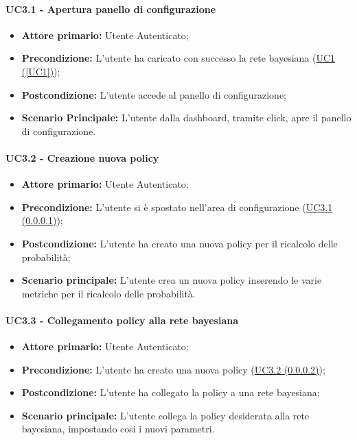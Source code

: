 \paragraph{UC3.1 - Apertura panello di configurazione}\label{UC3.1}
\begin{itemize}
	\item \textbf{Attore primario:} Utente Autenticato; 
	\item \textbf{Precondizione:} L'utente ha caricato con successo la rete bayesiana (\hyperref[UC1]{UC1 (\ref*{UC1})});
	\item \textbf{Postcondizione:} L'utente accede al panello di configurazione;
	\item \textbf{Scenario Principale:} L'utente dalla dashboard, tramite click, apre il panello di configurazione. 
\end{itemize}

\paragraph{UC3.2 - Creazione nuova policy}\label{UC3.2}

\begin{itemize}
	\item \textbf{Attore primario:} Utente Autenticato; 
	\item \textbf{Precondizione:} L'utente si è spostato nell'area di configurazione (\hyperref[UC3.1]{UC3.1 (\ref*{UC3.1})});
	\item \textbf{Postcondizione:} L'utente ha creato una nuova policy per il ricalcolo delle probabilità; 
	\item \textbf{Scenario principale:} L'utente crea un nuova policy inserendo le varie metriche per il ricalcolo delle probabilità.
\end{itemize}

\paragraph{UC3.3 - Collegamento policy alla rete bayesiana}\label{UC3.3}
\begin{itemize}
	\item \textbf{Attore primario:} Utente Autenticato; 
	\item \textbf{Precondizione:} L'utente ha creato una nuova policy (\hyperref[UC3.2]{UC3.2 (\ref{UC3.2})});
	\item \textbf{Postcondizione:} L'utente ha collegato la policy a una rete bayesiana; 
	\item \textbf{Scenario principale:} L'utente collega la policy desiderata alla rete bayesiana, impostando cosi i nuovi parametri. 
\end{itemize}
\newpage
